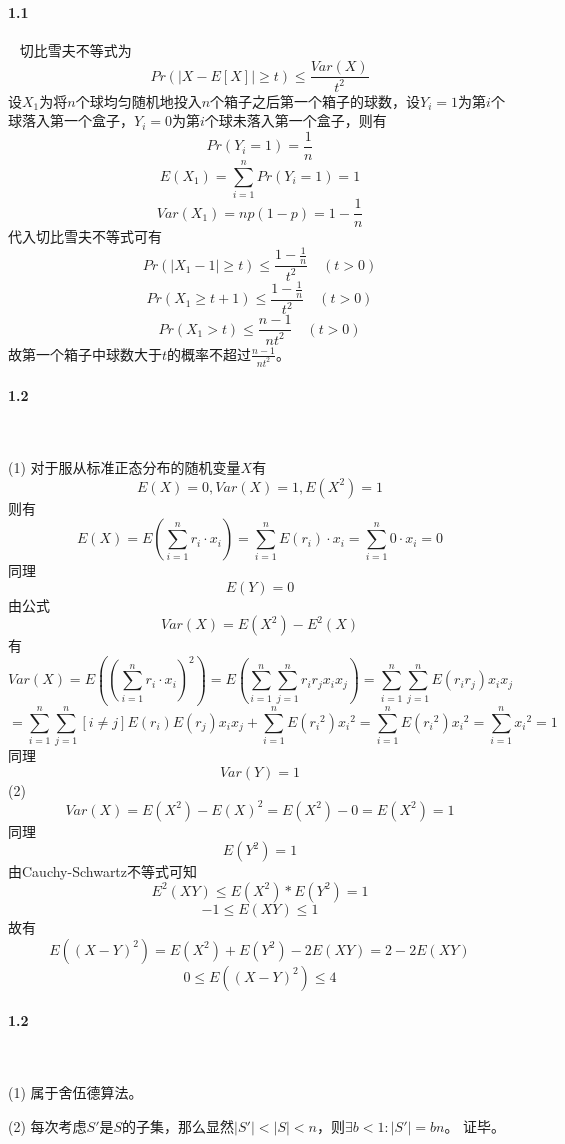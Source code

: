 \paragraph{1.1}~{}
切比雪夫不等式为 $$Pr(|X-E[X]| \ge t) \le \frac{Var(X)}{t^2}$$
设$X_{1}$为将$n$个球均匀随机地投入$n$个箱子之后第一个箱子的球数，设$Y_{i}=1$为第$i$个球落入第一个盒子，$Y_{i}=0$为第$i$个球未落入第一个盒子，则有$$Pr(Y_i=1)= \frac{1}{n}$$
$$E(X_1)= \sum_{i=1}^{n}{Pr(Y_i=1)}=1$$
$$Var(X_1) = np(1-p) = 1-\frac{1}{n}$$
代入切比雪夫不等式可有
$$Pr(|X_1-1| \ge t) \le \frac{1-\frac{1}{n}}{t^2} \quad (t>0)$$
$$Pr(X_1 \ge t+1) \le \frac{1-\frac{1}{n}}{t^2} \quad (t>0)$$
$$Pr(X_1 > t) \le \frac{n-1}{nt^2} \quad (t>0)$$
故第一个箱子中球数大于$t$的概率不超过$\frac{n-1}{nt^2}$。

\paragraph{1.2}~{}

(1)
对于服从标准正态分布的随机变量$X$有$$E(X)=0,Var(X)=1,E(X^2)=1$$则有
$$E(X)=E(\sum_{i=1}^{n}r_i\cdot x_i) = \sum_{i=1}^{n} E(r_i)\cdot x_i=\sum_{i=1}^{n}0\cdot x_i=0$$
同理 $$E(Y)=0$$
由公式$$Var(X)=E(X^2)-E^2(X)$$有
$$Var(X) = E((\sum_{i=1}^{n}r_i\cdot x_i)^2)=E(\sum_{i=1}^{n}\sum_{j=1}^{n}r_ir_jx_ix_j)=\sum_{i=1}^{n}\sum_{j=1}^{n}E(r_ir_j)x_ix_j$$
$$=\sum_{i=1}^{n}\sum_{j=1}^{n}[i \ne j]E(r_i)E(r_j)x_ix_j+\sum_{i=1}^{n}E({r_i}^2){x_i}^2=\sum_{i=1}^{n}E({r_i}^2){x_i}^2=\sum_{i=1}^{n}{x_i}^2=1$$
同理$$Var(Y)=1$$
(2)
$$Var(X)=E(X^2)-{E(X)}^2=E(X^2)-0=E(X^2)=1$$
同理$$E(Y^2)=1$$
由Cauchy-Schwartz不等式可知
$$E^2(XY) \le E(X^2)*E(Y^2) = 1$$
$$-1\le E(XY) \le 1$$
故有
$$E((X-Y)^2)=E(X^2)+E(Y^2)-2E(XY)=2-2E(XY)$$
$$0 \le E((X-Y)^2) \le 4$$

\paragraph{1.2}~{}

(1)
属于舍伍德算法。

(2)
每次考虑$S'$是$S$的子集，那么显然$|S'|<|S|<n$，则$\exists b<1:|S'|=bn$。
证毕。

